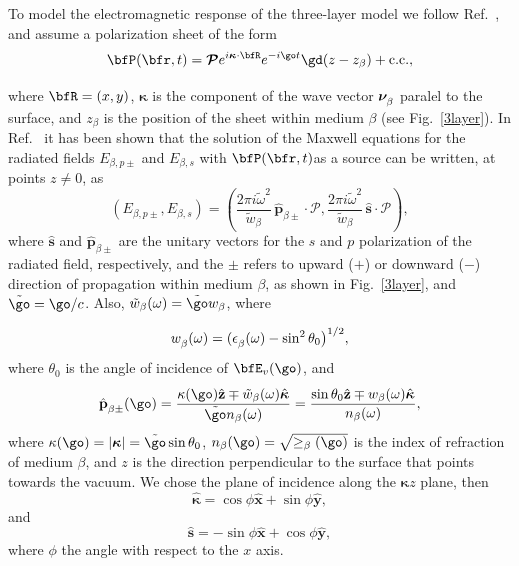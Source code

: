 \documentclass[aps,11pt]{revtex4}
\begin{document}
To model the electromagnetic response of the three-layer model 
we follow Ref.~,
and assume a polarization sheet of the form
\begin{align}\label{m31}
\bfP(\bfr,t)=\boldsymbol{\mathcal{P}}
e^{i\boldsymbol{\kappa}\cdot\bfR}e^{-i\go t}\gd(z-z_\beta)+\mathrm{c.c.}
,
\end{align}
where $\bfR=(x,y)$, $\boldsymbol{\kappa}$ 
is the component of the wave
vector $\boldsymbol{\nu}^{\strut}_\beta$ paralel to the surface, and
$z_\beta$ is the position of the sheet within
medium $\beta$ (see Fig.~\ref{3layer}).
In Ref.~ it has been shown 
that the solution of the Maxwell equations for the radiated fields 
$E_{\beta,p\pm}$ and $E_{\beta,s}$
with $\bfP(\bfr,t)$as a source can be written, at points
$z\neq 0$, as 
\begin{equation}\label{r2}
(E_{\beta,p\pm},E_{\beta,s}) = 
(\frac{2\pi i\tilde\omega^2}{\tilde w_\beta}
\,\hat{\mathbf{p}}_{\beta\pm}\cdot\boldsymbol{\mathcal{P}},
\frac{2\pi i\tilde\omega^2}{\tilde w_\beta}
\,\hat{\mathbf{s}}\cdot\boldsymbol{\mathcal{P}}),
\end{equation}
where $\hat{\mathbf{s}}$ and $\hat{\mathbf{p}}_{\beta\pm}$ are the unitary vectors for
the $s$ and $p$ polarization of the radiated field, 
respectively, and the $\pm$ refers to upward ($+$) or
downward ($-$) direction of propagation within medium $\beta$, as shown in
Fig.~\ref{3layer}, and $\tilde\go=\go/c$.
Also, $\tilde w_\beta(\omega)=\tilde\go w_\beta$, where
\begin{equation}\label{r3}
w^{\strut}_\beta(\omega)=(\epsilon^{\strut}_\beta(\omega) - \sin^2\theta_0\big)^{1/2},
\end{equation}
where $\theta_0$ is the angle of incidence of $\bfE_v(\go)$, 
and
\begin{equation}\label{r4}
\hat{\mathbf{p}}^{\strut}_{\beta\pm}(\go) =
\frac{\kappa(\go)\hat{\mathbf{z}}\mp \tilde 
  w_\beta(\omega)\hat{\boldsymbol{\kappa}}} 
{\tilde\go n_\beta(\omega)}
=
\frac{\sin\theta_0\hat{\mathbf{z}}\mp 
  w_\beta(\omega)\hat{\boldsymbol{\kappa}}} 
{n_\beta(\omega)}
,
\end{equation}
where $\kappa(\go)=|\boldsymbol{\kappa}|=\tilde\go\sin\theta_0$,
$n_\beta(\go)=\sqrt{\ge_\beta(\go)}$ is
the index of refraction of medium $\beta$, and
$z$ is the direction perpendicular to the surface that 
points towards the vacuum.
We chose the plane of incidence along the  
$\boldsymbol{\kappa}z$ plane, then \begin{equation}\label{mc1}
\hat{\boldsymbol{\kappa}}
= \cos\phi\hat{\mathbf{x}} + \sin\phi\hat{\mathbf{y}},
\end{equation}
and
\begin{equation}\label{mmc2}
\hat{\mathbf{s}} = -\sin\phi\hat{\mathbf{x}} + \cos\phi\hat{\mathbf{y}},
\end{equation}
where
$\phi$ the angle with respect to the $x$ axis.
\end{document}
